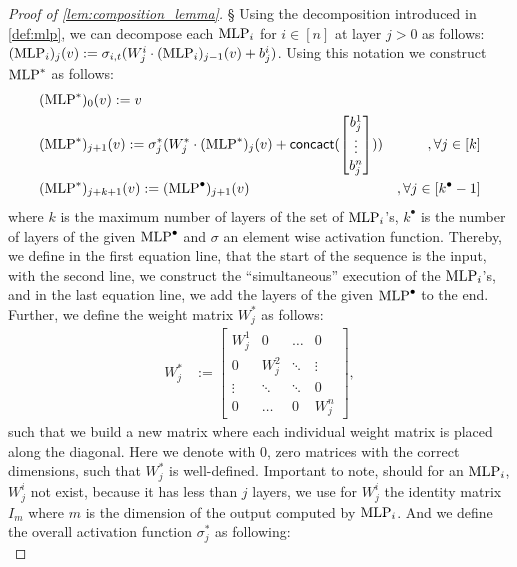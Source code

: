\begin{proof}[Proof of \cref{lem:composition_lemma}]
§    Using the decomposition introduced in \cref{def:mlp}, we can decompose each $\text{MLP}_i$ for $i \in [n]$ at layer $j > 0$ as follows: $(\text{MLP}_i)_{j}(v) := \sigma_{i,t}(W^{i}_{j} \cdot (\text{MLP}_i)_{j-1}(v) + b^i_j)$. Using this notation we construct $\text{MLP}^*$ as follows:
    \begin{align*}
        &(\text{MLP}^*)_{0}(v) := v\\
        &(\text{MLP}^*)_{j+1}(v) := \sigma^*_j(W^*_j \cdot (\text{MLP}^*)_{j} (v) + \textsf{concact}(
            \begin{bmatrix}
                b^1_j\\
                \vdots\\
                b^n_j
            \end{bmatrix})) &,\forall j \in [k]\\
        &(\text{MLP}^*)_{j+k+1}(v) := (\text{MLP}^\bullet)_{j+1}(v) &,\forall j \in [k^\bullet - 1]
    \end{align*}
    where $k$ is the maximum number of layers of the set of $\text{MLP}_i$'s, $k^\bullet$ is the number of layers of the given $\text{MLP}^\bullet$ and $\sigma$ an element wise activation function. Thereby, we define in the first equation line, that the start of the sequence is the input, with the second line, we construct the ``simultaneous'' execution of the $\text{MLP}_i$'s, and in the last equation line, we add the layers of the given $\text{MLP}^\bullet$ to the end. Further, we define the weight matrix $W_j^*$ as follows: 
    \begin{align*}
        W^*_j &:= \begin{bmatrix}
            W^1_j & 0 & \hdots & 0\\
            0 & W^2_j & \ddots & \vdots\\
            \vdots & \ddots & \ddots & 0\\
            0 & \hdots & 0 & W^n_j
        \end{bmatrix},
    \end{align*}
    such that we build a new matrix where each individual weight matrix is placed along the diagonal. Here we denote with $0$, zero matrices with the correct dimensions, such that $W_j^*$ is well-defined. Important to note, should for an $\text{MLP}_i$, $W^i_j$ not exist, because it has less than $j$ layers, we use for $W^i_j$ the identity matrix $I_m$ where $m$ is the dimension of the output computed by $\text{MLP}_i$. And we define the overall activation function $\sigma^*_j$ as following:
    \begin{equation*}

\end{equation*}
\end{proof}
